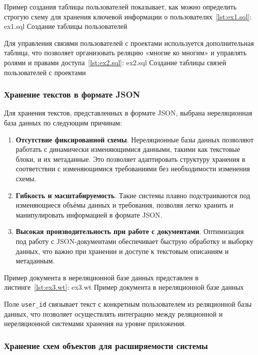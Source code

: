 Пример создания таблицы пользователей показывает, как можно определить строгую схему для хранения ключевой информации о пользователях~\ref{lst:ex1.sql}:
	{ex1.sql}
	{Создание таблицы пользователей}

Для управления связями пользователей с проектами используется дополнительная таблица, что позволяет организовать реляцию «многие ко многим» и управлять ролями и правами доступа~\ref{lst:ex2.sql}:
	{ex2.sql}
	{Создание таблицы связей пользователей с проектами}

\clearpage

\subsubsection{Хранение текстов в формате JSON}

Для хранения текстов, представленных в формате JSON, выбрана нереляционная база данных по следующим причинам:

\begin{enumerate}[wide=12.5mm, leftmargin=12.5mm]
    \item \textbf{Отсутствие фиксированной схемы}. Нереляционные базы данных позволяют работать с динамически изменяющимися данными, такими как текстовые блоки, и их метаданные. Это позволяет адаптировать структуру хранения в соответствии с изменяющимися требованиями без необходимости изменения схемы.
    \item \textbf{Гибкость и масштабируемость}. Такие системы плавно подстраиваются под изменяющиеся объёмы данных и требования, позволяя легко хранить и манипулировать информацией в формате JSON.
    \item \textbf{Высокая производительность при работе с документами}. Оптимизация под работу с JSON-документами обеспечивает быструю обработку и выборку данных, что важно при хранении и доступе к текстовым описаниям и метаданным.
\end{enumerate}

Пример документа в нереляционной базе данных представлен в листинге~\ref{lst:ex3.wt}:
	{ex3.wt}
	{Пример документа в нереляционной базе данных}

Поле \texttt{user\_id} связывает текст с конкретным пользователем из реляционной базы данных, что позволяет осуществлять интеграцию между реляционной и нереляционной системами хранения на уровне приложения. 

\subsubsection{Хранение схем объектов для расширяемости системы}


